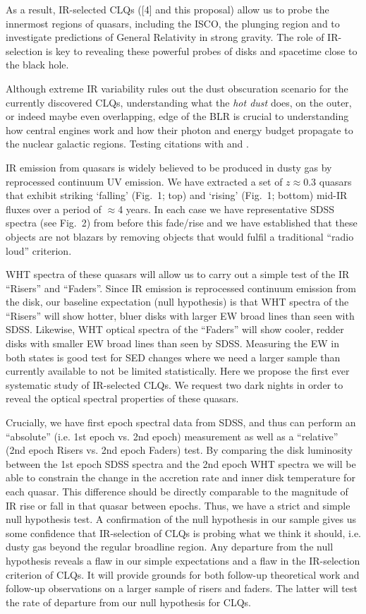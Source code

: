 \documentclass[a4paper,fleqn,usenatbib]{mnras}
\begin{document}
As a result, IR-selected CLQs ([4] and this proposal) allow us to
probe the innermost regions of quasars, including the ISCO, the
plunging region and to investigate predictions of General Relativity
in strong gravity. The role of IR-selection is key to revealing these
powerful probes of disks and spacetime close to the black hole.

Although extreme IR variability rules out the dust obscuration
scenario for the currently discovered CLQs, understanding what the
{\it hot dust} does, on the outer, or indeed maybe even overlapping,
edge of the BLR is crucial to understanding how central engines work
and how their photon and energy budget propagate to the nuclear
galactic regions. Testing citations with \citet{Ross2012} and
\citep{Ross2013}.

IR emission from quasars is widely believed to be produced in dusty
gas by reprocessed continuum UV emission. We have extracted a set of
$z\approx 0.3$ quasars that exhibit striking `falling' (Fig.~1; top)
and `rising' (Fig.~1; bottom) mid-IR fluxes over a period of
$\approx$4 years. In each case we have representative SDSS spectra
(see Fig.~2) from before this fade/rise and we have established that
these objects are not blazars by removing objects that would fulfil a
traditional ``radio loud'' criterion.

WHT spectra of these quasars will allow us to carry out a simple test
of the IR ``Risers'' and ``Faders''. Since IR emission is reprocessed
continuum emission from the disk, our baseline expectation (null
hypothesis) is that WHT spectra of the ``Risers'' will show hotter,
bluer disks with larger EW broad lines than seen with SDSS. Likewise,
WHT optical spectra of the ``Faders'' will show cooler, redder disks
with smaller EW broad lines than seen by SDSS. Measuring the EW in
both states is good test for SED changes where we need a larger sample
than currently available to not be limited statistically. Here we
propose the first ever systematic study of IR-selected CLQs.  We
request two dark nights in order to reveal the optical spectral
properties of these quasars.

Crucially, we have first epoch spectral data from SDSS, and thus can
perform an ``absolute'' (i.e. 1st epoch vs. 2nd epoch) measurement as
well as a ``relative'' (2nd epoch Risers vs. 2nd epoch Faders)
test. By comparing the disk luminosity between the 1st epoch SDSS
spectra and the 2nd epoch WHT spectra we will be able to constrain the
change in the accretion rate and inner disk temperature for each
quasar. This difference should be directly comparable to the magnitude
of IR rise or fall in that quasar between epochs.  Thus, we have a
strict and simple null hypothesis test. A confirmation of the null
hypothesis in our sample gives us some confidence that IR-selection of
CLQs is probing what we think it should, i.e. dusty gas beyond the
regular broadline region. Any departure from the null hypothesis
reveals a flaw in our simple expectations and a flaw in the
IR-selection criterion of CLQs. It will provide grounds for both
follow-up theoretical work and follow-up observations on a larger
sample of risers and faders. The latter will test the rate of
departure from our null hypothesis for CLQs.
\end{document}
